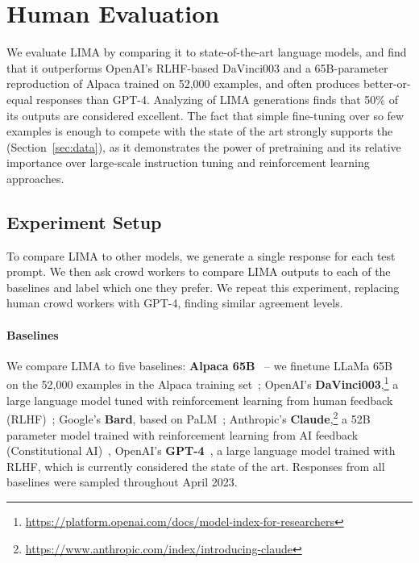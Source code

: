 \section{Human Evaluation}

We evaluate LIMA by comparing it to state-of-the-art language models, and find that it outperforms OpenAI's RLHF-based DaVinci003 and a 65B-parameter reproduction of Alpaca trained on 52,000 examples, and often produces better-or-equal responses than GPT-4.
Analyzing of LIMA generations finds that 50\% of its outputs are considered excellent.
The fact that simple fine-tuning over so few examples is enough to compete with the state of the art strongly supports the \hypothesis{} (Section~\ref{sec:data}), as it demonstrates the power of pretraining and its relative importance over large-scale instruction tuning and reinforcement learning approaches.


\subsection{Experiment Setup}

To compare LIMA to other models, we generate a single response for each test prompt.
We then ask crowd workers to compare LIMA outputs to each of the baselines and label which one they prefer.
We repeat this experiment, replacing human crowd workers with GPT-4, finding similar agreement levels.

\paragraph{Baselines}
We compare LIMA to five baselines:
\textbf{Alpaca 65B}~\citep{alpaca} -- we finetune LLaMa 65B~\citep{touvron2023llama} on the 52,000 examples in the Alpaca training set~\citep{alpaca};
OpenAI's \textbf{DaVinci003},\footnote{\url{https://platform.openai.com/docs/model-index-for-researchers}} a large language model tuned with reinforcement learning from human feedback (RLHF)~\citep{ouyang2022training};
Google's \textbf{Bard}, based on PaLM~\citep{chowdhery2022palm};
Anthropic's \textbf{Claude},\footnote{\url{https://www.anthropic.com/index/introducing-claude}} a 52B parameter model trained with reinforcement learning from AI feedback (Constitutional AI)~\cite{bai2022constitutional},
OpenAI's \textbf{GPT-4}~\citep{openai2023gpt4}, a large language model trained with RLHF, which is currently considered the state of the art.
Responses from all baselines were sampled throughout April 2023.

